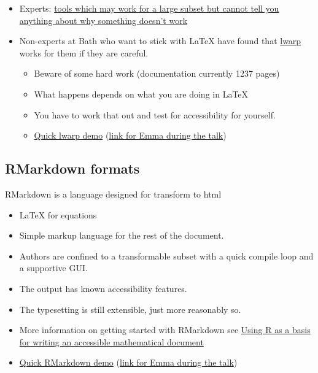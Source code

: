 \documentclass[
  12pt,
  a4paper]{extarticle}
\providecommand{\tightlist}{%
  \setlength{\itemsep}{0pt}\setlength{\parskip}{0pt}}
\theoremstyle{plain}
\theoremstyle{plain}
\theoremstyle{plain}
\theoremstyle{plain}
\theoremstyle{plain}
\theoremstyle{definition}
\theoremstyle{definition}
\theoremstyle{definition}
\theoremstyle{remark}
\renewcommand{\;}{\,}
\begin{document}
\begin{itemize}
\tightlist
\item
  Experts: \href{https://hub.docker.com/r/bathmash/mathaltnotes}{tools which may work for a large subset but cannot tell you anything about why something doesn't work}
\item
  Non-experts at Bath who want to stick with LaTeX have found that \href{https://ctan.org/pkg/lwarp?lang=en}{lwarp} works for them if they are careful.

  \begin{itemize}
  \tightlist
  \item
    Beware of some hard work (documentation currently 1237 pages)
  \item
    What happens depends on what you are doing in LaTeX
  \item
    You have to work that out and test for accessibility for yourself.
  \item
    \href{https://github.com/STEM-Enable/Getting-started-with-accessible-maths-March-2023/raw/main/example/LwarpExample.zip}{Quick lwarp demo} (\href{https://posit.cloud/content/5657619}{link for Emma during the talk})
  \end{itemize}
\end{itemize}

\hypertarget{rmarkdown-formats}{%
\subsection{RMarkdown formats}\label{rmarkdown-formats}}

RMarkdown is a language designed for transform to html

\begin{itemize}
\tightlist
\item
  LaTeX for equations
\item
  Simple markup language for the rest of the document.
\item
  Authors are confined to a transformable subset with a quick compile loop and a supportive GUI.
\item
  The output has known accessibility features.
\item
  The typesetting is still extensible, just more reasonably so.
\item
  More information on getting started with RMarkdown see \href{https://stem-enable.github.io/RMarkdownWorkshop/}{Using R as a basis for writing an accessible mathematical document}
\item
  \href{https://github.com/STEM-Enable/RMarkdownWorkshop/raw/master/examples/arclengthInR.zip}{Quick RMarkdown demo} (\href{https://posit.cloud/content/4447915}{link for Emma during the talk})
\end{itemize}
\end{document}
